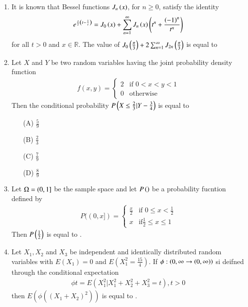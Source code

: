 \documentclass[journal]{IEEEtran}
\begin{document}
\begin{enumerate}
\item It is known that Bessel functions $J_n\left(x\right)$, for $n\geq 0$, satisfy the identity 
\begin{align*}
    e^{\frac{x}{2}\left(t-\frac{1}{t}\right)}=J_0\left(x\right)+\sum_{n=1}^\infty J_n\left(x\right)\left(t^n+\frac{\left(-1\right)^n}{t^n}\right)
\end{align*}
for all $t>0$ and $x \in \mathbb{R}$. The value of $J_0\left(\frac{\pi}{3}\right)+2\sum_{n=1}^\infty J_{2n}\left(\frac{\pi}{3}\right)$ is equal to
\vspace{0.5cm}

\item Let $X$ and $Y$ be two random variables having the joint probability density function
\begin{align*}
    f(x, y) = \begin{cases}
    2 & \text{if } 0 < x < y < 1 \\
    0 & \text{otherwise}
\end{cases}
\end{align*}
Then the conditional probability $P\left(X\leq \frac{2}{3}| Y-\frac{3}{4}\right)$ is equal to
\begin{multicols}{2}
\begin{enumerate}
    \item[(A)] $\frac{5}{9}$
    \item[(B)] $\frac{2}{3}$
    \item[(C)] $\frac{7}{9}$
    \item[(D)] $\frac{8}{9}$
\end{enumerate}
\end{multicols}

\vspace{0.5cm}

\item Let $\ohm =(0,1]$ be the sample space and let $P\left(\right)$ be a probability fucntion defined by 
\begin{align*}
    P((0, x]) = \begin{cases}
    \frac{x}{2} & \text{if } 0 \leq x < \frac{1}{2} \\
    x & \text{if} \frac{1}{2}\leq x \leq 1
\end{cases}
\end{align*}
Then $P\left({{\frac{1}{2}}}\right)$ is equal to \underline{\hspace{2cm}}.
\vspace{0.5cm}

\item Let $X_1,X_2$ and $X_3$ be independent and identically distributed random variables with $E(X_1)=0$ and $E(X_1^2=\frac{15}{4})$. If $\phi:\left(0,\infty \rightarrow \left(0, \infty\right)\right)$ si deifned through the conditional expectation 
\begin{align*}
    \phi{t}=E(X_1^2|X_1^2+X_2^2+X_3^2 = t) , t>0
\end{align*}
then $E(\phi((X_1+X_2)^2))$ is equal to \underline{\hspace{2cm}}.


\end{enumerate}
\end{document}
